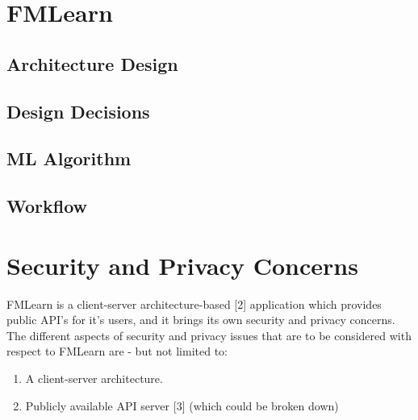 \section{FMLearn}
\label{fmlearn}

\subsection{Architecture Design}
\label{architecture}

\subsection{Design Decisions}
\label{design-decisioins}

\subsection{ML Algorithm}
\subsection{Workflow}

\section{Security and Privacy Concerns}
FMLearn is a client-server architecture-based [2] application which provides public API’s for it's users, and it brings its own security and privacy concerns. The different aspects of security and privacy issues that are to be considered with respect to FMLearn are - but not limited to:

\begin{enumerate}
    \item A client-server architecture.
    \item Publicly available API server [3] (which could be broken down)
\end{enumerate}

